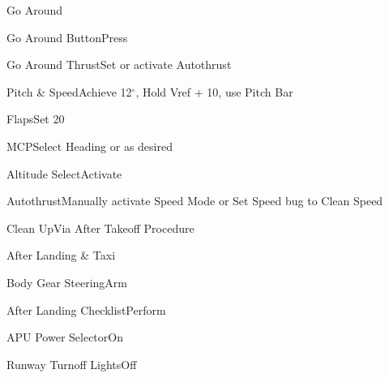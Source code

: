 \documentclass[sim-use, blue_items]{checklist}
\begin{document}
\begin{checklist}{Go Around}
	\item{Go Around Button}{Press}
	\item{Go Around Thrust}{Set or activate Autothrust}
	\item{Pitch \& Speed}{Achieve 12$^\circ$, Hold Vref + 10, use Pitch Bar}
	\item{Flaps}{Set 20}
	\item{MCP}{Select Heading or as desired}
	\item{Altitude Select}{Activate}
	\item{Autothrust}{Manually activate Speed Mode or Set Speed bug to Clean Speed}
	\item{Clean Up}{Via After Takeoff Procedure}
\end{checklist}

\begin{checklist}{After Landing \& Taxi}
	\item{Body Gear Steering}{Arm}
	\item{After Landing Checklist}{Perform}
	\item{APU Power Selector}{On}
\end{checklist}

\begin{continuedchecklist}
	 {
		\item{Runway Turnoff Lights}{Off}
	}
\end{continuedchecklist}
\end{document}
